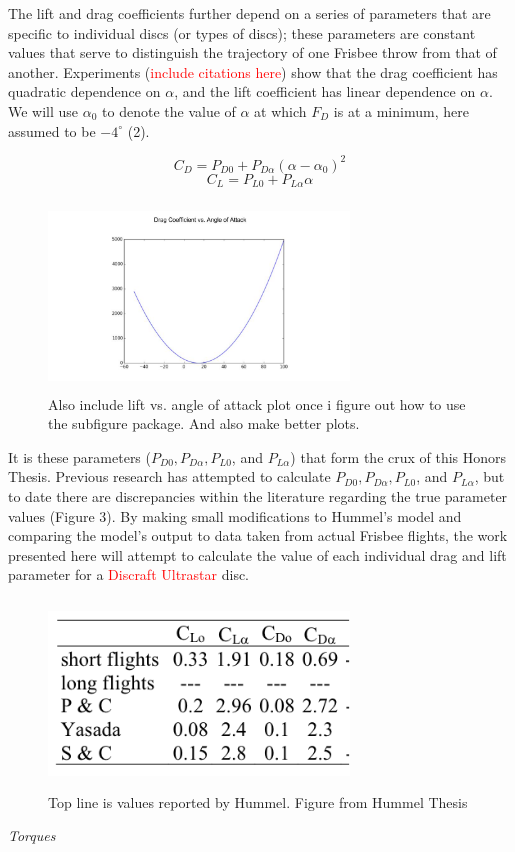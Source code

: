 \documentclass[a4paper,12pt, oneside]{article}
\newcommand{\red}[1]{\textcolor{red}{#1}}
\begin{document}
The lift and drag coefficients further depend on a series of parameters that are specific to individual discs (or types of discs); these parameters are constant values that serve to distinguish the trajectory of one Frisbee throw from that of another.  Experiments (\red{include citations here}) show that the drag coefficient has quadratic dependence on $\alpha$, and the lift coefficient has linear dependence on $\alpha$. We will use $\alpha_0$ to denote the value of $\alpha$ at which $F_D$ is at a minimum, here assumed to be $-4^{\circ}$ (2).

\begin{equation}
  C_D=P_{D0}+P_{D\alpha}(\alpha-\alpha_0)^2
\end{equation}
\begin{equation}
  C_L=P_{L0}+P_{L\alpha}\alpha
\end{equation}
\begin{figure}[H]
	\centering
	\includegraphics[width=8cm, height=5cm]{DragCoefficientPlot}
	\caption{\color{red}Also include lift vs. angle of attack plot once i figure out how to use the subfigure package. And also make better plots. \color{black}}
\end{figure}
\color{BurntOrange}
It is these parameters ($P_{D0}, P_{D\alpha}, P_{L0}$, and $P_{L\alpha}$) that form the crux of this Honors Thesis. Previous research has attempted to calculate $P_{D0}, P_{D\alpha}, P_{L0}$, and $P_{L\alpha}$, but to date there are discrepancies within the literature regarding the true parameter values (Figure 3). By making small modifications to Hummel's model and comparing the model's output to data taken from actual Frisbee flights, the work presented here will attempt to calculate the value of each individual drag and lift parameter for a \red{Discraft Ultrastar} disc.

\begin{figure}[H]
	\centering
	\includegraphics[width=8cm, height=5cm]{ParameterValues}
	\caption{\color{red}Top line is values reported by Hummel. Figure from Hummel Thesis \color{black}}
\end{figure}
\textit{Torques}
\end{document}
